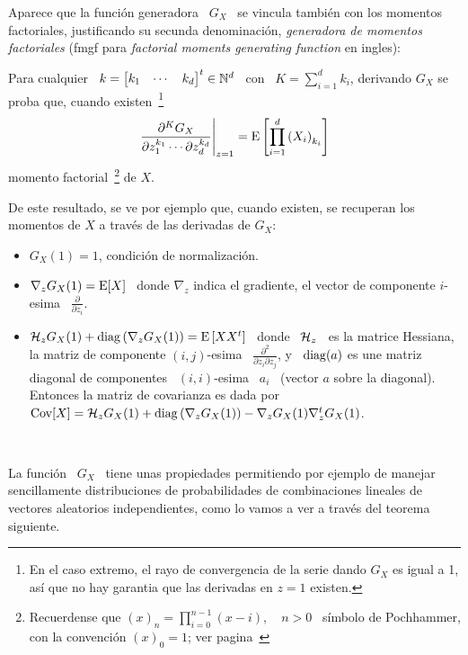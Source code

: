 Aparece  que la  funci\'on generadora  \ $G_X$  \ se  vincula tambi\'en  con los
momentos factoriales, justificando su secunda denominaci\'on, {\em generadora de
  momentos factoriales}  (fmgf para {\em factorial  moments generating function}
en ingles):
%
\begin{lema}
\label{Lem:MP:GeneracionMomentosFactoriales}
%
  Para cualquier \  $k = \begin{bmatrix} k_1 & \cdots  & k_d \end{bmatrix}^t \in
  \mathbb{N}^d$ \ con \ $K =  \sum_{i=1}^d k_i$, derivando $G_X$ se proba que, cuando
  existen~\footnote{En el  caso extremo,  el rayo de  convergencia de  la serie
    dando $G_X$ es igual a 1, as\'i  que no hay garantia que las derivadas en $z
    = 1$ existen.}
  \[
  \left.\frac{\partial^K     G_X}{\partial     z_1^{k_1}     \cdots     \partial
      z_d^{k_d}}\right|_{z=1}    =   \operatorname{E}\left[    \prod_{i=1}^d    \left(   X_i
    \right)_{k_i} \right]
  \]
  momento factorial~\footnote{Recuerdense que  $(x)_n = \prod_{i=0}^{n-1} (x-i),
    \quad n > 0$ \ s\'imbolo de Pochhammer, con la convenci\'on $(x)_0 = 1$; ver
    pagina~\pageref{Foot:MP:Pochhammer}} de $X$.
\end{lema}

De  este resultado,  se ve  por ejemplo  que, cuando  existen, se  recuperan los
momentos de $X$ a trav\'es de las derivadas de $G_X$:
%
\begin{itemize}
\item $G_X(1) = 1$, condici\'on de normalizaci\'on.
%
\item $\nabla_z G_X(1) = \operatorname{E}[X]$ \ donde $\nabla_z$ indica el gradiente, \ie el
  vector de componente $i$-esima \ $\frac{\partial}{\partial z_i}$.
%
\item $\mathcal{H}_z G_X(1)  + \operatorname{diag}\left( \nabla_z G_X(1) \right)  = \operatorname{E}\left[ X X^t
  \right]$  \ donde  \ $\mathcal{H}_z$  \ es  la matrice  Hessiana, \ie  la  matriz de
  componente $(i,j)$-esima \ $\frac{\partial^2}{\partial z_i \partial z_j}$, y \
  $\operatorname{diag}(a)$ es  une matriz  diagonal de componentes  \ $(i,i)$-esima \  $a_i$ \
  (vector $a$ sobre la diagonal).  Entonces  la matriz de covarianza es dada por
  \ $\operatorname{Cov}[X] =  \mathcal{H}_z G_X(1) + \operatorname{diag}\left( \nabla_z  G_X(1) \right) - \nabla_z
  G_X(1) \nabla_z^t G_X(1)$.
\end{itemize}

\

La funci\'on \ $G_X$ \ tiene unas propiedades permitiendo por ejemplo de manejar
sencillamente  distribuciones  de probabilidades  de  combinaciones lineales  de
vectores aleatorios independientes,  como lo vamos a ver  a trav\'es del teorema
siguiente.

